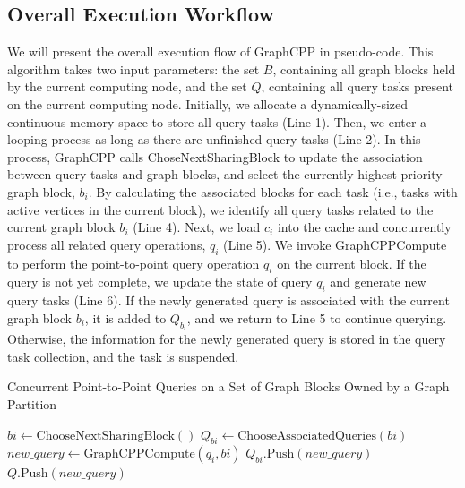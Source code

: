 \documentclass[lettersize,journal]{IEEEtran} %
\begin{document}
\subsection{Overall Execution Workflow}
We will present the overall execution flow of GraphCPP in pseudo-code. This algorithm takes two input parameters: the set $B$, containing all graph blocks held by the current computing node, and the set $Q$, containing all query tasks present on the current computing node. Initially, we allocate a dynamically-sized continuous memory space to store all query tasks (Line 1). Then, we enter a looping process as long as there are unfinished query tasks (Line 2). In this process, GraphCPP calls ChoseNextSharingBlock to update the association between query tasks and graph blocks, and select the currently highest-priority graph block, $b_i$. By calculating the associated blocks for each task (i.e., tasks with active vertices in the current block), we identify all query tasks related to the current graph block $b_i$ (Line 4). Next, we load $c_i$ into the cache and concurrently process all related query operations, $q_i$ (Line 5). We invoke GraphCPPCompute to perform the point-to-point query operation $q_i$ on the current block. If the query is not yet complete, we update the state of query $q_i$ and generate new query tasks (Line 6). If the newly generated query is associated with the current graph block $b_i$, it is added to $Q_{b_i}$, and we return to Line 5 to continue querying. Otherwise, the information for the newly generated query is stored in the query task collection, and the task is suspended.

\begin{algorithm}
  \caption{Concurrent Point-to-Point Queries on a Set of Graph Blocks Owned by a Graph Partition}
  \label{algorithm:concurrent-queries}
  \begin{algorithmic}[1]
   
          \State $bi \gets \text{ChooseNextSharingBlock}()$
          \State $Q_{bi} \gets \text{ChooseAssociatedQueries}(bi)$
           
              \State $new\_query \gets \text{GraphCPPCompute}(q_i, bi)$ 
                  \State $Q_{bi}.\text{Push}(new\_query)$
              \Else
                  \State $Q.\text{Push}(new\_query)$
              \EndIf
          \EndFor
      \EndWhile
  \EndFunction
  \end{algorithmic}
  \end{algorithm}
  
\end{document}
